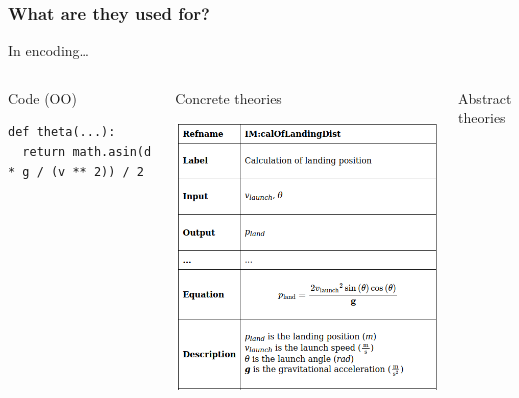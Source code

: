 \documentclass[xcolor={dvipsnames}]{beamer}
\begin{document}
\begin{frame}[fragile]
  \frametitle{What are they used for?}

  In encoding\ldots{}
  \begin{columns}
    \begin{column}{0.3\textwidth}
      \begin{center}
        Code (OO)

        \vspace{1em}

\begin{verbatim}
def theta(...):
  return math.asin(d * g / (v ** 2)) / 2
\end{verbatim}
      \end{center}
    \end{column}
    \hfill
    \begin{column}{0.3\textwidth}
      \begin{center}
        Concrete theories
        
        \vspace{1.4em}

        \includegraphics[width=\textwidth]{concreteTheory.png}
      \end{center}
    \end{column}
    \hfill
    \begin{column}{0.3\textwidth}
      \begin{center}
        Abstract theories
        

\end{center}
\end{column}
\end{columns}
\end{frame}
\end{document}
